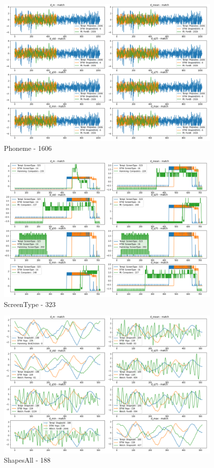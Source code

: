 \documentclass[phd,black, hidelinks]{PrincetonThesis}
\begin{document}
\begin{figure}[htbp]
\centering
\includegraphics[width=.9\linewidth]{./img/dtw_comp_res/Phoneme_1606.png}
\caption{\label{fig:org0dd450a}Phoneme - 1606}
\end{figure}

\begin{figure}[htbp]
\centering
\includegraphics[width=.9\linewidth]{./img/dtw_comp_res/ScreenType_323.png}
\caption{\label{fig:org64009d8}ScreenType - 323}
\end{figure}

\begin{figure}[htbp]
\centering
\includegraphics[width=.9\linewidth]{./img/dtw_comp_res/ShapesAll_188.png}
\caption{\label{fig:org54549bb}ShapesAll - 188}
\end{figure}
\end{document}

